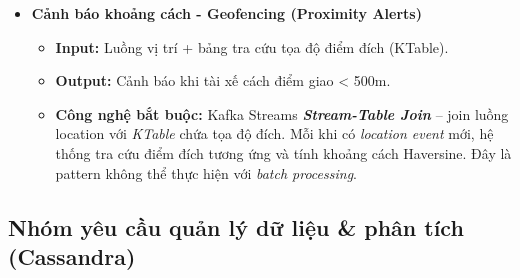 \begin{itemize}
    \item \textbf{Cảnh báo khoảng cách - Geofencing (Proximity Alerts)}
    \begin{itemize}
        \item \textbf{Input:} Luồng vị trí + bảng tra cứu tọa độ điểm đích (KTable).
        \item \textbf{Output:} Cảnh báo khi tài xế cách điểm giao < 500m.
        \item \textbf{Công nghệ bắt buộc:} Kafka Streams \textbf{\textit{Stream-Table Join}} -- join luồng location với \textit{KTable} chứa tọa độ đích. Mỗi khi có \textit{location event} mới, hệ thống tra cứu điểm đích tương ứng và tính khoảng cách Haversine. Đây là pattern không thể thực hiện với \textit{batch processing}.
    \end{itemize}

\end{itemize}

\subsection{Nhóm yêu cầu quản lý dữ liệu \& phân tích (Cassandra)}
\label{sec:analytics-requirements}

